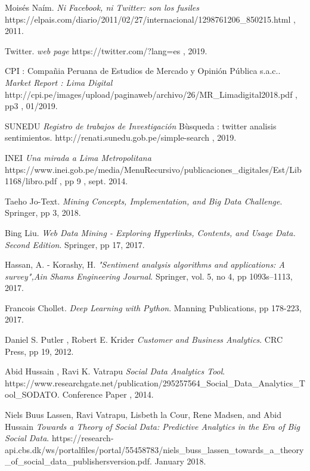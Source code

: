 %
\begin{thebibliography}{9}



Mois\'es Na\'im. 
\textit{Ni Facebook, ni Twitter: son los fusiles}
https://elpais.com/diario/2011/02/27/internacional/1298761206\_850215.html , 2011.

Twitter. 
\textit{web page}
https://twitter.com/?lang=es , 2019.

CPI : Compa\~nia Peruana de Estudios de Mercado y Opini\'on P\'ublica s.a.c.. 
\textit{Market Report : Lima Digital}
http://cpi.pe/images/upload/paginaweb/archivo/26/MR\_Limadigital2018.pdf ,  pp3 , 01/2019.

SUNEDU 
\textit{Registro de trabajos de Investigaci\'on}
Bùsqueda : twitter analisis sentimientos.
http://renati.sunedu.gob.pe/simple-search , 2019.

INEI 
\textit{Una mirada a Lima Metropolitana}
https://www.inei.gob.pe/media/MenuRecursivo/publicaciones\_digitales/Est/Lib1168/libro.pdf , pp 9 , sept. 2014.


Taeho Jo-Text.
\textit{Mining Concepts, Implementation, and Big Data Challenge}. 
Springer, pp 3, 2018.
 
Bing Liu. 
\textit{Web Data Mining - Exploring Hyperlinks, Contents, and Usage Data. Second Edition}. 
Springer, pp 17, 2017.
 
Hassan, A. - Korashy, H.
\textit{"Sentiment analysis algorithms and applications: A survey",Ain Shams Engineering Journal}. 
Springer, vol. 5, no 4, pp 1093s–1113, 2017.
 
Francois Chollet.
\textit{Deep Learning with Python}. 
Manning Publications, pp 178-223, 2017.

Daniel S. Putler , Robert E. Krider
\textit{Customer and Business Analytics}. 
CRC Press, pp 19, 2012.

Abid Hussain , Ravi K. Vatrapu
\textit{Social Data Analytics Tool}. 
https://www.researchgate.net/publication/295257564\_Social\_Data\_Analytics\_Tool\_SODATO.
Conference Paper ,  2014.

Niels Buus Lassen, Ravi Vatrapu, Lisbeth la Cour, Rene Madsen, and Abid Hussain
\textit{Towards a Theory of Social Data: Predictive Analytics in the Era of Big Social Data}. 
https://research-api.cbs.dk/ws/portalfiles/portal/55458783/niels\_buss\_lassen\_towards\_a\_theory\_of\_social\_data\_publishersversion.pdf.
January 2018.


\end{thebibliography}
